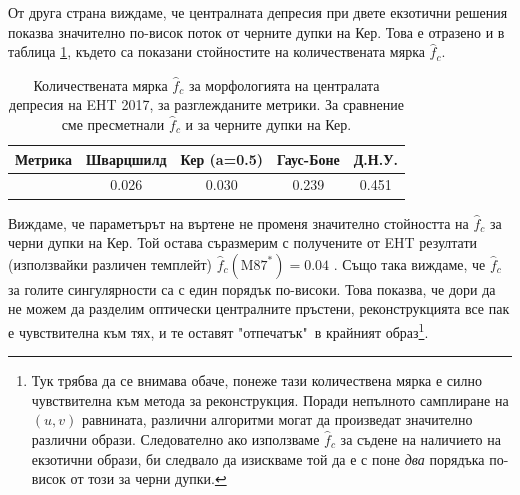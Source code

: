 От друга страна виждаме, че централната депресия при двете екзотични решения показва значително по-висок поток от черните дупки на Кер. Това е отразено и в таблица \ref{table:f_2017}, където са показани стойностите на количествената мярка $\hat{f}_c$.

\begin{table}[h!]
	\centering
	\begin{tabular}{||c|c|c|c|c||}
		\hline
		{Метрика} & {Шварцшилд}&{Кер (a=0.5)}&{Гаус-Боне}&{Д.Н.У.}
		\\\hline
		{\thead{$\hat{f}_c$}} & 0.026&0.030&0.239&0.451
		\\\hline
	\end{tabular}
	\caption[Количествената мярка $\hat{f}_c$ за морфологията на централата депресия на EHT 2017]{\small Количествената мярка $\hat{f}_c$ за морфологията на централата депресия на EHT 2017, за разглежданите метрики. За сравнение сме пресметнали $\hat{f}_c$ и за черните дупки на Кер.}
	\label{table:f_2017}
\end{table}

Виждаме, че параметърът на въртене не променя значително стойността на $\hat{f}_c$ за черни дупки на Кер. Той остава съразмерим с получените от EHT резултати (използвайки различен темплейт) $\hat{f}_c(\text{M}87^*) = 0.04$ \cite{EHT_M87_IV}. Също така виждаме, че $\hat{f}_c$ за голите сингулярности са с един порядък по-високи. Това показва, че дори да не можем да разделим оптически централните пръстени, реконструкцията все пак е чувствителна към тях, и те оставят "отпечатък"$\,$ в крайният образ\footnote{Тук трябва да се внимава обаче, понеже тази количествена мярка е силно чувствителна към метода за реконструкция. Поради непълното самплиране на $(u,v)$ равнината, различни алгоритми могат да произведат значително различни образи. Следователно ако използваме $\hat{f}_c$  за съдене на наличието на екзотични образи, би следвало да изискваме той да е с поне \emph{два} порядъка по-висок от този за черни дупки.}.

\newpage

